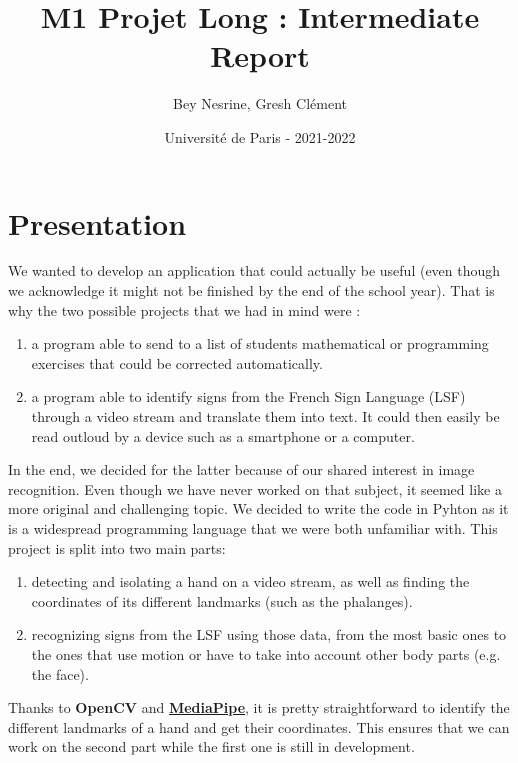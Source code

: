 \documentclass{article}
\begin{document}
	\title{M1 Projet Long : Intermediate Report} 
	\author{Bey Nesrine, Gresh Clément}
	
	\date{Université de Paris - 2021-2022 }
	
	\maketitle
	


	
	\section{ Presentation }\label{sec:first}
	We wanted to develop an application that could actually be useful (even though we acknowledge it might not be finished by the end of the school year). That is why the two possible projects that we had in mind were :

\begin{enumerate}
  \item a program able to send to a list of students mathematical or programming exercises that could be corrected automatically.
  \item a program able to identify signs from the French Sign Language (LSF) through a video stream and translate them into text. It could then easily be read outloud by a device such as a smartphone or a computer.
\end{enumerate}

In the end, we decided for the latter because of our shared interest in image recognition. Even though we have never worked on that subject, it seemed like a more original and challenging topic. We decided to write the code in Pyhton as it is a widespread programming language that we were both unfamiliar with. This project is split into two main parts: 
\begin{enumerate}
  \item detecting and isolating a hand on a video stream, as well as finding the coordinates of its different landmarks (such as the phalanges).
  \item recognizing signs from the LSF using those data, from the most basic ones to the ones that use motion or have to take into account other body parts (e.g. the face).
\end{enumerate}

Thanks to \textbf{OpenCV} and \href{https://mediapipe.dev/}{\textbf{MediaPipe}}, it is pretty straightforward to identify the different landmarks of a hand and get their coordinates. This ensures that we can work on the second part while the first one is still in development.
	
\end{document}
